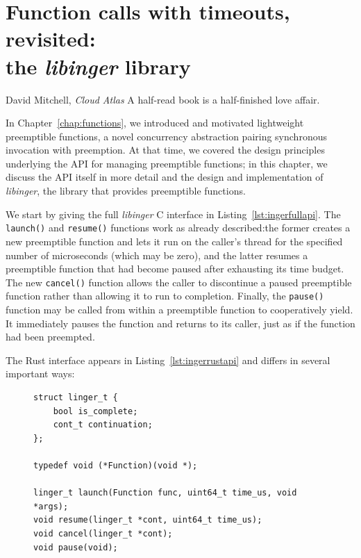 \chapter{Function calls with timeouts, revisited: \\ the \textit{libinger} library}
\label{chap:libinger}

\ifdefined\chapquotes
\vspace{-0.5in}
\begin{chapquote}[1.5in]{David Mitchell, \textit{Cloud Atlas}}
A half-read book is a half-finished love affair.
\end{chapquote}
\fi

In Chapter~\ref{chap:functions}, we introduced and motivated lightweight preemptible
functions, a novel concurrency abstraction pairing synchronous invocation with
preemption.  At that time, we covered the design principles underlying the API for
managing preemptible functions; in this chapter, we discuss the API itself in
more detail and the design and implementation of \textit{libinger}, the library that
provides preemptible functions.

We start by giving the full \textit{libinger} C interface in
Listing~\ref{lst:ingerfullapi}.  The \texttt{launch()} and \texttt{resume()}
functions work as already described:\@ the former creates a new preemptible function
and lets it run on the caller's thread for the specified number of microseconds
(which may be zero), and the latter resumes a preemptible function that had become
paused after exhausting its time budget.  The new \texttt{cancel()} function allows
the caller to discontinue a paused preemptible function rather than allowing it to
run to completion.  Finally, the \texttt{pause()} function may be called from within
a preemptible function to cooperatively yield.  It immediately pauses the function
and returns to its caller, just as if the function had been preempted.

The Rust interface appears in Listing~\ref{lst:ingerrustapi} and differs in several
important ways:

\begin{figure}
\begin{lstlisting}[label=lst:ingerfullapi,caption=Preemptible functions extended C interface,morekeywords=uint64_t]
struct linger_t {
	bool is_complete;
	cont_t continuation;
};

typedef void (*Function)(void *);

linger_t launch(Function func, uint64_t time_us, void *args);
void resume(linger_t *cont, uint64_t time_us);
void cancel(linger_t *cont);
void pause(void);
\end{lstlisting}
\end{figure}


